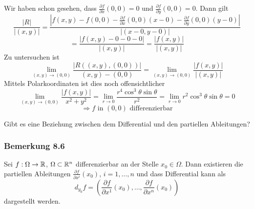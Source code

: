 \begin{enumerate}[\indent a)]
Wir haben schon gesehen, dass $\frac{\partial f}{\partial x}\left( 0,0\right)=0$ und $\frac{\partial f}{\partial y}\left( 0,0\right)=0$. Dann gilt \[\frac{{\left| R \right|}}{{\left| {\left( {x,y} \right)} \right|}} = \frac{{\left| {f\left( {x,y} \right) - f\left( {0,0} \right) - \frac{{\partial f}}{{\partial x}}\left( {0,0} \right)\left( {x - 0} \right) - \frac{{\partial f}}{{\partial y}}\left( {0,0} \right)\left( {y - 0} \right)} \right|}}{{\left| {\left( {x - 0,y - 0} \right)} \right|}}\] \[ = \frac{{\left| {f\left( {x,y} \right) - 0 - 0 - 0} \right|}}{{\left| {\left( {x,y} \right)} \right|}} = \frac{{\left| {f\left( {x,y} \right)} \right|}}{{\left| {\left( {x,y} \right)} \right|}}\]
Zu untersuchen ist
\[\mathop {\lim }\limits_{\left( {x,y} \right) \to \left( {0,0} \right)}  \frac{{\left| {R\left( {\left( {x,y} \right),\left( {0,0} \right)} \right)} \right|}}{{\left( {x,y} \right) - \left( {0,0} \right)}} = \mathop {\lim }\limits_{\left( {x,y} \right) \to \left( {0,0} \right)} \frac{{\left| {f\left( {x,y} \right)} \right|}}{{\left| {\left( {x,y} \right)} \right|}}\]
Mittels Polarkoordinaten ist dies noch offensichtlicher
\[\mathop {\lim }\limits_{\left( {x,y} \right) \to \left( {0,0} \right)} \frac{{\left| {f\left( {x,y} \right)} \right|}}{{{x^2} + {y^2}}} = \mathop {\lim }\limits_{r \to 0} \frac{{{r^4}{{\cos }^3}\theta \sin \theta }}{{{r^2}}} = \mathop {\lim }\limits_{r \to 0} {r^2}{\cos ^3}\theta \sin \theta  = 0\] \[\Rightarrow f\text{ in }\left( 0,0\right)\text{ differenzierbar}\]
\end{enumerate}

\noindent Gibt es eine Beziehung zwischen dem Differential und den partiellen Ableitungen?

\subsubsection*{Bemerkung 8.6}

Sei $f:\Omega\to\mathbb{R}$, $\Omega\subset\mathbb{R}^n$ differenzierbar an der Stelle $x_0\in\Omega$. Dann existieren die partiellen Ableitungen $\frac{\partial f}{\partial x^i}\left( x_0\right)$, $i=1,\dots,n$ und dass Differential kann als \[{d_{{y_0}}}f = \left( {\frac{{\partial f}}{{\partial {x^1}}}\left( {{x_0}} \right), \ldots ,\frac{{\partial f}}{{\partial {x^n}}}\left( {{x_0}} \right)} \right)\] dargestellt werden.

